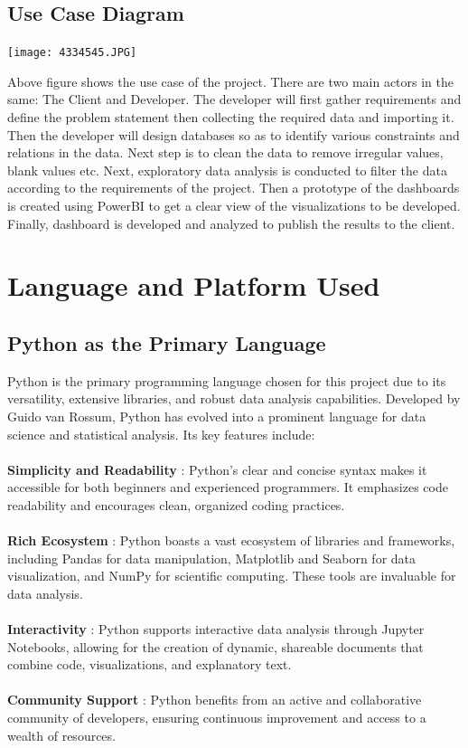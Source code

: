 \documentclass{article}
\begin{document}
\subsection{Use Case Diagram }

\vspace{1cm}
        \begin{center}
            \texttt{[image: 4334545.JPG]}\\
        \end{center}
\vspace{0.3cm}
Above figure shows the use case of the project. There are two main actors in the same: The Client and Developer. The developer will first gather requirements and define the problem statement then collecting the required data and importing it. Then the developer will design databases so as to identify various constraints and relations in the data. Next step is to clean the data to remove irregular values, blank values etc. Next, exploratory data analysis is conducted to filter the data according to the requirements of the project. Then a prototype of the dashboards is created using PowerBI to get a clear view of the visualizations to be developed. Finally, dashboard is developed and analyzed to publish the results to the client. 

\section{Language and Platform Used}
\vspace{0.5cm}
\subsection{Python as the Primary Language}
Python is the primary programming language chosen for this project due to its versatility, extensive libraries, and robust data analysis capabilities. Developed by Guido van Rossum, Python has evolved into a prominent language for data science and statistical analysis. Its key features include:\\ \\ \textbf{Simplicity and Readability } : Python's clear and concise syntax makes it accessible for both beginners and experienced programmers. It emphasizes code readability and encourages clean, organized coding practices.\\ \\ \textbf{Rich Ecosystem} : Python boasts a vast ecosystem of libraries and frameworks, including Pandas for data manipulation, Matplotlib and Seaborn for data visualization, and NumPy for scientific computing. These tools are invaluable for data analysis.\\ \\ \textbf{Interactivity} : Python supports interactive data analysis through Jupyter Notebooks, allowing for the creation of dynamic, shareable documents that combine code, visualizations, and explanatory text.\\ \\ \textbf{Community Support} : Python benefits from an active and collaborative community of developers, ensuring continuous improvement and access to a wealth of resources. \vspace{0.5cm}
\end{document}
